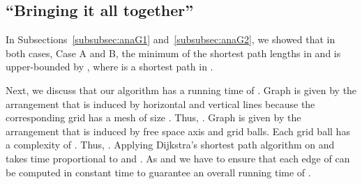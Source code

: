\documentclass[a4paper,11pt]{article}
\begin{document}
\subsection{``Bringing it all together''}

	In Subsections~\ref{subsubsec:anaG1} and~\ref{subsubsec:anaG2}, we showed that in both  cases, Case A and B,  the minimum of the shortest path lengths in  and  is upper-bounded by , where  is a shortest path in . 

	Next, we discuss that our algorithm has a running time of . Graph  is given by the arrangement that is induced by  horizontal and  vertical lines because the corresponding grid has a mesh of size  . Thus, . Graph	 is given by the arrangement that is induced by  free space axis and  grid balls. Each grid ball has a complexity of . Thus, . Applying Dijkstra's  shortest path algorithm on  and  takes time proportional to   and . 
As  and  we have to ensure that each edge of  can be computed in constant time to guarantee an overall running time of .
\end{document}
